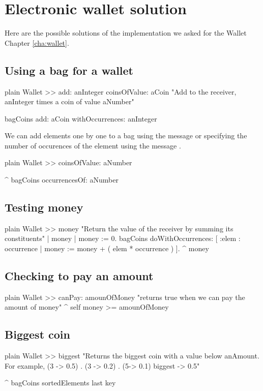 \documentclass[10pt,twoside,english]{_support/latex/sbabook/sbabook}
\begin{document}
\frontmatter
\pagestyle{plain}

\tableofcontents*
\clearpage\listoffigures

\mainmatter

\chapter{Electronic wallet solution}\label{cha:walletSol}
Here are the possible solutions of the implementation we asked for the Wallet Chapter \ref{cha:wallet}. 
\section{Using a bag for a wallet}
\begin{displaycode}{plain}
Wallet >> add: anInteger coinsOfValue: aCoin
	"Add to the receiver, anInteger times a coin of value aNumber"

	bagCoins add: aCoin withOccurrences: anInteger 
\end{displaycode}

We can add elements one by one to a bag using the message  or specifying the number of occurences of the element using the message . 

\begin{displaycode}{plain}
Wallet >> coinsOfValue: aNumber

	^ bagCoins occurrencesOf: aNumber
\end{displaycode}
\section{Testing money}
\begin{displaycode}{plain}
Wallet >> money
	"Return the value of the receiver by summing its constituents"
	| money |
	money := 0.
	bagCoins doWithOccurrences:
			[ :elem : occurrence | 
				money := money + ( elem * occurrence ) ].
	^ money
\end{displaycode}
\section{Checking to pay an amount}
\begin{displaycode}{plain}
Wallet >> canPay: amounOfMoney
	"returns true when we can pay the amount of money"
	^ self money >= amounOfMoney
\end{displaycode}
\section{Biggest coin}
\begin{displaycode}{plain}
Wallet >> biggest
	"Returns the biggest coin with a value below anAmount. For example, {(3 -> 0.5) . (3 -> 0.2) . (5-> 0.1)} biggest -> 0.5"

	^ bagCoins sortedElements last key
\end{displaycode}
\end{document}
